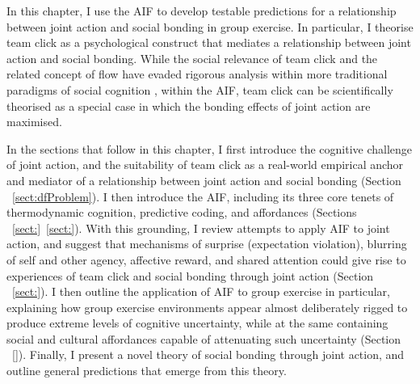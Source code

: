 \begin{CJK}{UTF8}{gbsn}
In this chapter, I use the AIF to develop testable predictions for a relationship between joint action and social bonding in group exercise.  In particular, I theorise team click as a psychological construct that mediates a relationship between joint action and social bonding.  While the social relevance of team click and the related concept of flow have evaded rigorous analysis within more traditional paradigms of social cognition \cite[for explanations as to why, see][]{Dietrich2004,Slingerland2014}, within the AIF, team click can be scientifically theorised as a special case in which the bonding effects of joint action are maximised.


In the sections that follow in this chapter, I first introduce the cognitive challenge of joint action, and the suitability of team  click as a real-world empirical anchor and mediator of a relationship between joint action and social bonding (Section ~\ref{sect:dfProblem}).  I then introduce the AIF, including its three core tenets of thermodynamic cognition, predictive coding, and affordances (Sections ~\ref{sect:}\nobreakdash~\ref{sect:}).  With this grounding, I review attempts to apply AIF to joint action, and suggest that mechanisms of surprise (expectation violation), blurring of self and other agency, affective reward, and shared attention could give rise to experiences of team click and social bonding through joint action (Section ~\ref{sect:}).  I then outline the application of AIF to group exercise in particular, explaining how group exercise environments appear almost deliberately rigged to produce extreme levels of cognitive uncertainty, while at the same containing social and cultural affordances capable of attenuating such uncertainty (Section ~\ref{}).  Finally, I present a novel theory of social bonding through joint action, and outline general predictions that emerge from this theory.




\end{CJK}
